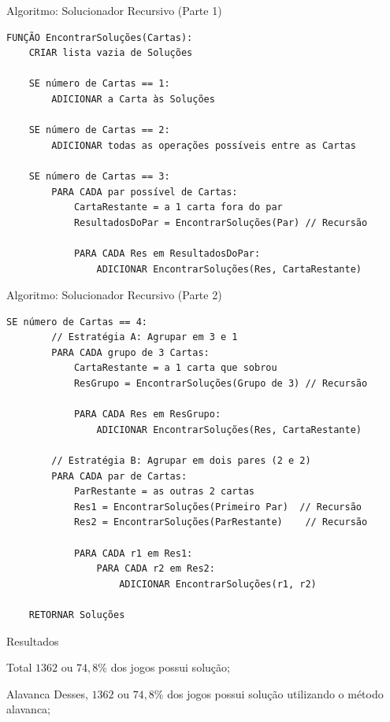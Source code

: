 \documentclass[aspectratio=169]{beamer}
\begin{document}
\begin{frame}[fragile]{Algoritmo: Solucionador Recursivo (Parte 1)}
	\begin{lstlisting}[mathescape=true]
FUNÇÃO EncontrarSoluções(Cartas):
    CRIAR lista vazia de Soluções

    SE número de Cartas == 1:
        ADICIONAR a Carta às Soluções
    
    SE número de Cartas == 2:
        ADICIONAR todas as operações possíveis entre as Cartas

    SE número de Cartas == 3:
        PARA CADA par possível de Cartas:
            CartaRestante = a 1 carta fora do par
            ResultadosDoPar = EncontrarSoluções(Par) // Recursão

            PARA CADA Res em ResultadosDoPar:
                ADICIONAR EncontrarSoluções(Res, CartaRestante)
\end{lstlisting}
\end{frame}


\begin{frame}[fragile]{Algoritmo: Solucionador Recursivo (Parte 2)}
	\begin{lstlisting}[mathescape=true]
    SE número de Cartas == 4:
        // Estratégia A: Agrupar em 3 e 1
        PARA CADA grupo de 3 Cartas:
            CartaRestante = a 1 carta que sobrou
            ResGrupo = EncontrarSoluções(Grupo de 3) // Recursão

            PARA CADA Res em ResGrupo:
                ADICIONAR EncontrarSoluções(Res, CartaRestante)

        // Estratégia B: Agrupar em dois pares (2 e 2)
        PARA CADA par de Cartas:
            ParRestante = as outras 2 cartas
            Res1 = EncontrarSoluções(Primeiro Par)  // Recursão
            Res2 = EncontrarSoluções(ParRestante)    // Recursão

            PARA CADA r1 em Res1:
                PARA CADA r2 em Res2:
                    ADICIONAR EncontrarSoluções(r1, r2)

    RETORNAR Soluções
\end{lstlisting}
\end{frame}

\begin{frame}{Resultados}
	\begin{block}{Total}
		$1362$ ou $74,8\%$ dos jogos possui solução;
	\end{block}

	\begin{block}{Alavanca}
		Desses, $1362$ ou $74,8\%$ dos jogos possui solução utilizando o método alavanca;
	\end{block}
\end{frame}
\end{document}
